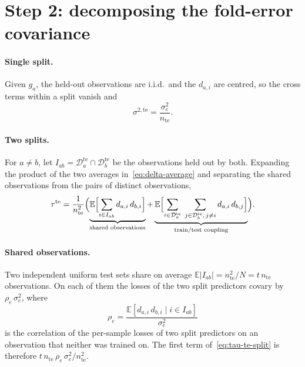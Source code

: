 \documentclass[11pt]{article}
\begin{document}
\section{Step 2: decomposing the fold-error covariance}

\paragraph{Single split.}
Given $g_a$, the held-out observations are i.i.d.\ and the $d_{a,i}$ are centred, so the cross
terms within a split vanish and
\begin{equation}
  \sigma^{2,\mathrm{te}} = \frac{\sigma^2_e}{n_{\text{te}}}.
\end{equation}

\paragraph{Two splits.}
For $a \neq b$, let $I_{ab} = \mathcal{D}^{\text{te}}_a \cap \mathcal{D}^{\text{te}}_b$ be the
observations held out by both. Expanding the product of the two averages
in~\eqref{eq:delta-average} and separating the shared observations from the pairs of distinct
observations,
\begin{equation}
  \tau^{\mathrm{te}}
  = \frac{1}{n_{\text{te}}^2}
    \Bigl(
      \underbrace{\mathbb{E}\Bigl[\sum_{i \in I_{ab}} d_{a,i}\, d_{b,i}\Bigr]}_{\text{shared observations}}
      +
      \underbrace{\mathbb{E}\Bigl[\sum_{i \in \mathcal{D}^{\text{te}}_a}\;
                  \sum_{j \in \mathcal{D}^{\text{te}}_b,\, j \neq i} d_{a,i}\, d_{b,j}\Bigr]}_{\text{train/test coupling}}
    \Bigr).
  \label{eq:tau-te-split}
\end{equation}

\paragraph{Shared observations.}
Two independent uniform test sets share on average
$\mathbb{E}|I_{ab}| = n_{\text{te}}^2 / N = t\, n_{\text{te}}$ observations. On each of them
the losses of the two split predictors covary by $\rho_e\,\sigma^2_e$, where
\begin{equation}
  \rho_e = \frac{\mathbb{E}[d_{a,i}\, d_{b,i} \mid i \in I_{ab}]}{\sigma^2_e}
\end{equation}
is the correlation of the per-sample losses of two split predictors on an observation that
neither was trained on. The first term of~\eqref{eq:tau-te-split} is therefore
$t\, n_{\text{te}}\, \rho_e\, \sigma^2_e / n_{\text{te}}^2$.
\end{document}
